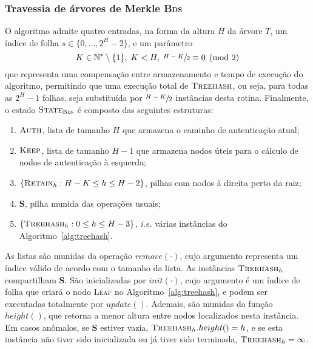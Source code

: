 \documentclass{ufsctex/ufsctex}
\newcommand{\bds}{\textsc{Bds}}
\begin{document}
\subsubsection{Travessia de árvores de Merkle \bds{}}\label{subsubsection:bds}

O algoritmo admite quatro entradas, na forma da altura $H$ da árvore $T$, um
índice de folha $s \in \{0, \dots, 2^{H} - 2\}$, e um parâmetro
\begin{equation}\label{eq:kparam}
  K \in \mathbb{N}^{*} \setminus \{1\},
    \; K < H, \; \sfrac{H - K}{2} \equiv 0 \pmod{2}
\end{equation}
que representa uma compensação entre armazenamento e tempo de execução do
algoritmo, permitindo que uma execução total de $\textsc{Treehash}$, ou seja,
para todas as $2^{H} - 1$ folhas, seja substituída por $\sfrac{H - K}{2}$
instâncias desta rotina. Finalmente, o estado $\textsc{State}_{\bds{}}$ é
composto das seguintes estruturas:

\begin{enumerate}[label= (\roman*)]

  \item $\textsc{Auth}$, lista de tamanho $H$ que armazena o caminho de
      autenticação atual;

  \item $\textsc{Keep}$, lista de tamanho $H - 1$ que armazena nodos úteis para
      o cálculo de nodos de autenticação à esquerda;

  \item $\{\textsc{Retain}_{h} : H - K \leq h \leq H - 2\}$, pilhas com nodos à
      direita perto da raiz;

  \item \textbf{S}, pilha munida das operações usuais;

  \item $\{\textsc{Treehash}_{h} : 0 \leq h \leq H - 3\}$, \emph{i.e.} várias
      instâncias do Algoritmo~\ref{alg:treehash}.

\end{enumerate}

As listas são munidas da operação $remove(\cdot)$, cujo argumento representa um
índice válido de acordo com o tamanho da lista. As instâncias
$\textsc{Treehash}_{h}$ compartilham \textbf{S}. São inicializadas por
$init(\cdot)$, cujo argumento é um índice de folha que criará o nodo
\textsc{Leaf} no Algoritmo~\ref{alg:treehash}, e podem ser executadas
totalmente por $update()$. Ademais, são munidas da função $height()$, que
retorna a menor altura entre nodos localizados nesta instância. Em casos
anômalos, se \textbf{S} estiver vazia, $\textsc{Treehash}_{h}.height() = h$, e
se esta instância não tiver sido inicializada ou já tiver sido terminada,
$\textsc{Treehash}_{h} = \infty$.
\end{document}
